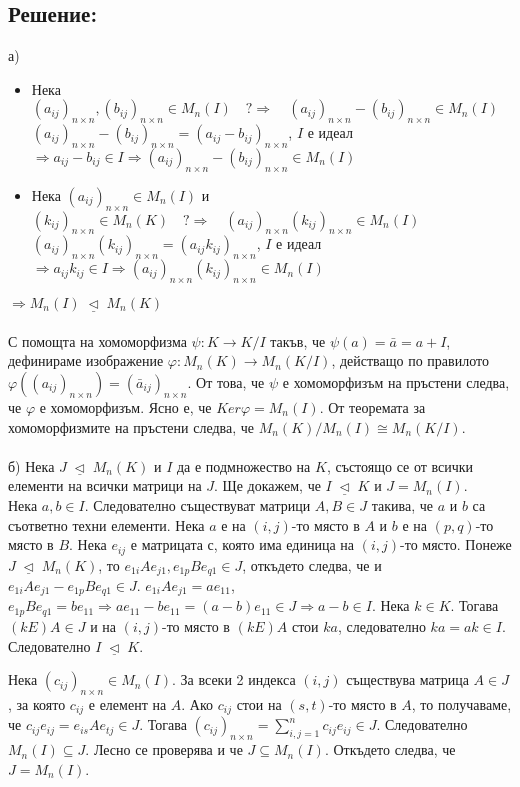 \documentclass[10pt]{article}
\newcommand{\triq}{\; \underline{\triangleleft} \;}
\begin{document}
\subsection*{Решение:}
а)
\begin{itemize}
	\item Нека $(a_{ij})_{n \times n}, (b_{ij})_{n \times n} \in M_n(I) \quad ?\Rightarrow \quad (a_{ij})_{n \times n} - (b_{ij})_{n \times n} \in M_n(I)$\\$(a_{ij})_{n \times n} - (b_{ij})_{n \times n} = (a_{ij} - b_{ij})_{n \times n}$, $I$ е идеал $\Rightarrow a_{ij} - b_{ij} \in I \Rightarrow (a_{ij})_{n \times n} - (b_{ij})_{n \times n} \in M_n(I)$
	
	\item Нека $(a_{ij})_{n \times n} \in M_n(I)$ и $(k_{ij})_{n \times n} \in M_n(K) \quad ?\Rightarrow \quad (a_{ij})_{n \times n}(k_{ij})_{n \times n} \in M_n(I)$\\$(a_{ij})_{n \times n}(k_{ij})_{n \times n} = (a_{ij}k_{ij})_{n \times n}$, $I$ е идеал $\Rightarrow a_{ij}k_{ij} \in I \Rightarrow (a_{ij})_{n \times n}(k_{ij})_{n \times n} \in M_n(I)$
\end{itemize}
$\Rightarrow M_n(I) \triq M_n(K)$\\\\

С помощта на хомоморфизма $\psi: K \to K/I$ такъв, че $\psi(a) = \bar{a} = a + I$, дефинираме изображение $\varphi: M_n(K) \to M_n(K/I)$, действащо по правилото $\varphi((a_{ij})_{n \times n}) = (\bar{a}_{ij})_{n \times n}$. От това, че $\psi$ е хомоморфизъм на пръстени следва, че $\varphi$ е хомоморфизъм. Ясно е, че $Ker\varphi = M_n(I)$. От теоремата за хомоморфизмите на пръстени следва, че $M_n(K)/M_n(I) \cong M_n(K/I)$.\\\\
б) Нека $J \triq M_n(K)$ и $I$ да е подмножество на $K$, състоящо се от всички елементи на всички матрици на $J$. Ще докажем, че $I \triq K$ и $J = M_n(I)$.\\
Нека $a, b \in I$. Следователно съществуват матрици $A, B \in J$ такива, че $a$ и $b$ са съответно техни елементи. Нека $a$ е на $(i, j)$-то място в $A$ и $b$ е на $(p, q)$-то място в $B$. Нека $e_{ij}$ е матрицата с, която има единица на $(i, j)$-то място. Понеже $J \triq M_n(K)$, то $e_{1i}Ae_{j1}, e_{1p}Be_{q1} \in J$, откъдето следва, че и $e_{1i}Ae_{j1} - e_{1p}Be_{q1} \in J$. $e_{1i}Ae_{j1} = ae_{11}$, $e_{1p}Be_{q1} = be_{11} \Rightarrow ae_{11} - be_{11} = (a - b)e_{11} \in J \Rightarrow a - b \in I$. Нека $k \in K$. Тогава $(kE)A \in J$ и на $(i, j)$-то място в $(kE)A$ стои $ka$, следователно $ka = ak \in I$. Следователно $I \triq K$.

Нека $(c_{ij})_{n \times n} \in M_n(I)$. За всеки 2 индекса $(i, j)$ съществува матрица $A \in J$, за която $c_{ij}$ е елемент на $A$. Ако $c_{ij}$ стои на $(s, t)$-то място в $A$, то получаваме, че $c_{ij}e_{ij} = e_{is}Ae_{tj} \in J$. Тогава $(c_{ij})_{n \times n} = \sum_{i, j=1}^{n} c_{ij}e_{ij} \in J$. Следователно $M_n(I) \subseteq J$. Лесно се проверява и че $J \subseteq M_n(I)$. Откъдето следва, че $J = M_n(I)$.
\end{document}

